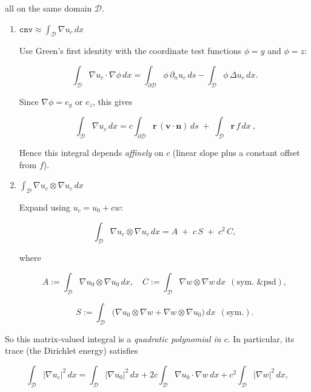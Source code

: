all on the same domain $\mathscr D$.

\begin{enumerate}

\item $\displaystyle \mathtt{cnv} \approx \int_{\mathscr D}\nabla u_c\,dx$

Use Green’s first identity with the coordinate test functions $\phi=y$ and $\phi=z$:

$$
\int_{\mathscr D}\nabla u_c\cdot \nabla \phi\,dx
= \int_{\partial\mathscr D}\phi\,\partial_n u_c\,ds
  - \int_{\mathscr D}\phi\,\Delta u_c\,dx.
$$

Since $\nabla \phi=e_y$ or $e_z$, this gives 




$$
\boxed{\ \int_{\mathscr D}\nabla u_c\,dx
= c\int_{\partial\mathscr D} \bm{r}\,(\bm{v}\!\cdot \bm{n})\,ds\;+\;\int_{\mathscr D} \bm{r}\,f\,dx\ ,}
$$

Hence this integral depends \emph{affinely} on $c$ (linear slope plus a constant offset from $f$).

\item $\displaystyle \int_{\mathscr D}\nabla u_c\otimes \nabla u_c\,dx$

Expand using $u_c=u_0+c w$:

$$
\int_{\mathscr D}\nabla u_c\otimes \nabla u_c\,dx
= A \;+\; c\,S \;+\; c^2\,C,
$$

where

$$
A:=\int_{\mathscr D}\nabla u_0\otimes\nabla u_0\,dx,\quad
C:=\int_{\mathscr D}\nabla w\otimes\nabla w\,dx\ \ (\text{sym.\ \& psd}),
$$

$$
S:=\int_{\mathscr D}\!\big(\nabla u_0\otimes\nabla w+\nabla w\otimes\nabla u_0\big)\,dx\ \ (\text{sym.}).
$$
\end{enumerate}


So this matrix-valued integral is a \emph{quadratic polynomial in $c$}. 
In particular, its trace (the Dirichlet energy) satisfies

$$
\int_{\mathscr D}|\nabla u_c|^2\,dx
= \int_{\mathscr D}|\nabla u_0|^2\,dx
+ 2c\int_{\mathscr D}\nabla u_0\cdot \nabla w\,dx
+ c^2\int_{\mathscr D}|\nabla w|^2\,dx,
$$

